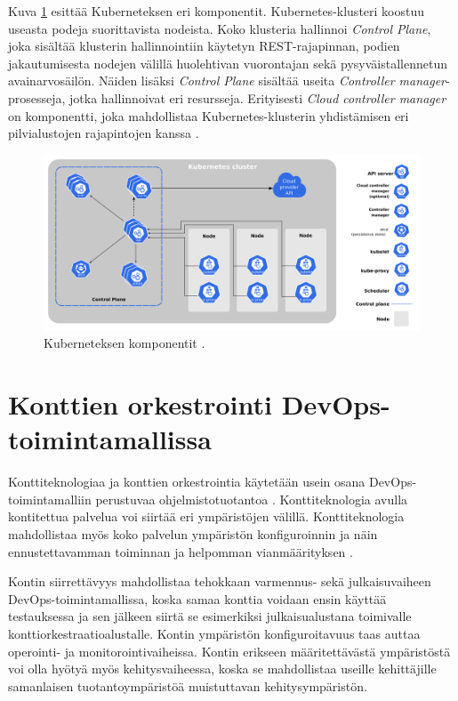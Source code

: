 Kuva \ref{fig:kubernetes} esittää Kuberneteksen eri komponentit. Kubernetes-klusteri koostuu useasta podeja suorittavista nodeista.
Koko klusteria hallinnoi \textit{Control Plane}, joka sisältää klusterin hallinnointiin käytetyn REST-rajapinnan, podien jakautumisesta nodejen välillä huolehtivan vuorontajan sekä pysyväistallennetun avainarvosäilön.
Näiden lisäksi \textit{Control Plane} sisältää useita \textit{Controller manager}-prosesseja, jotka hallinnoivat eri resursseja.
Erityisesti \textit{Cloud controller manager} on komponentti, joka mahdollistaa Kubernetes-klusterin yhdistämisen eri pilvialustojen rajapintojen kanssa \cite{components23}.

\begin{figure}[ht]
\begin{center}
\includegraphics[width=1\textwidth]{figures/kubernetes_components.png}
\caption{Kuberneteksen komponentit \cite{components23}\label{fig:kubernetes}.}
\end{center}
\end{figure}

\section{Konttien orkestrointi DevOps-toimintamallissa\label{orchestration:devops}}

Konttiteknologiaa ja konttien orkestrointia käytetään usein osana DevOps-toimintamalliin perustuvaa ohjelmistotuotantoa \cite{Kang16, Narasimhulu23}.
Konttiteknologia avulla kontitettua palvelua voi siirtää eri ympäristöjen välillä.
Konttiteknologia mahdollistaa myös koko palvelun ympäristön konfiguroinnin ja näin ennustettavamman toiminnan ja helpomman vianmäärityksen \cite{Narasimhulu23}.

Kontin siirrettävyys mahdollistaa tehokkaan varmennus- sekä julkaisuvaiheen DevOps-toimintamallissa, koska samaa konttia voidaan ensin käyttää testauksessa ja sen jälkeen siirtä se esimerkiksi julkaisualustana toimivalle konttiorkestraatioalustalle.
Kontin ympäristön konfiguroitavuus taas auttaa operointi- ja monitorointivaiheissa.
Kontin erikseen määritettävästä ympäristöstä voi olla hyötyä myös kehitysvaiheessa, koska se mahdollistaa useille kehittäjille samanlaisen tuotantoympäristöä muistuttavan kehitysympäristön.

